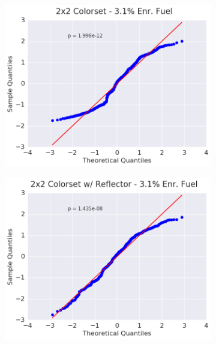 \begin{figure}[h!]
\begin{subfigure}{0.5\textwidth}
  \centering
  \includegraphics[width=\linewidth]{figures/patterns/2x2/quantile/31-enr-capt-1}
  \caption{}
  \label{fig:chap9-qq-2x2-3.1-capt}
\end{subfigure}%
\begin{subfigure}{0.5\textwidth}
  \centering
  \includegraphics[width=\linewidth]{figures/patterns/reflector/quantile/31-enr-capt-1}  \caption{}
  \label{fig:chap9-qq-reflector-3.1-capt}
\end{subfigure}
\begin{subfigure}{0.5\textwidth}
  \centering

\end{subfigure}
\end{figure}
